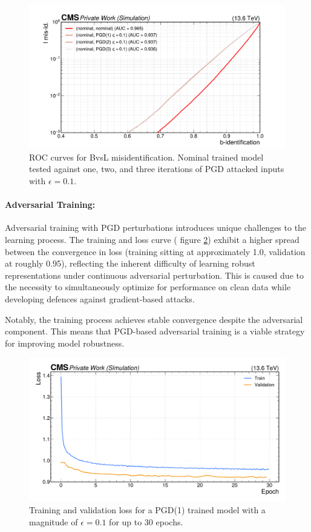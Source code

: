 \begin{figure}[h]
\centering
    \includegraphics[width=15cm]{media/output/roc_bvsl_pgd_its_1_2_3.pdf}
    \caption{ROC curves for BvsL misidentification. Nominal trained model tested against one, two, and three iterations of PGD attacked inputs with $\epsilon=0.1$.}
    \label{fig:pgd_iterations}
\end{figure}

\paragraph{Adversarial Training:} Adversarial training with PGD perturbations introduces unique challenges to the learning process. The training and loss curve ( figure \ref{fig:pgd_loss_curve}) exhibit a higher spread between the convergence in loss (training sitting at approximately 1.0, validation at roughly 0.95), reflecting the inherent difficulty of learning robust representations under continuous adversarial perturbation. This is caused due to the necessity to simultaneously optimize for performance on clean data while developing defences against gradient-based attacks.

Notably, the training process achieves stable convergence despite the adversarial component. This means that PGD-based adversarial training is a viable strategy for improving model robustness.

\begin{figure}[h]
\centering
    
    \includegraphics[width=15cm]{media/output/pgd_loss_validation.pdf}
    \caption{Training and validation loss for a PGD(1) trained model with a magnitude of $\epsilon=0.1$ for up to 30 epochs.}
    \label{fig:pgd_loss_curve}
\end{figure}

